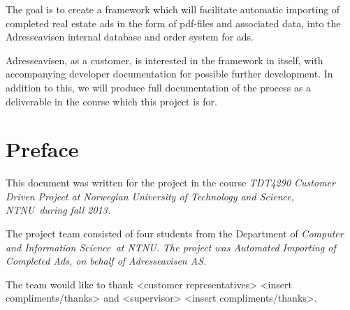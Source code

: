The goal is to create a framework which will facilitate automatic importing of completed real estate ads in the form of pdf-files and associated data, into the Adresseavisen internal database and order system for ads.

Adresseavisen, as a customer, is interested in the framework in itself, with accompanying developer documentation for possible further development. In addition to this, we will produce full documentation of the process as a deliverable in the course which this project is for.

\newpage

\section{Preface}
This document was written for the project in the course \em TDT4290 Customer Driven Project at Norwegian University of Technology and Science, NTNU\em \ during fall 2013.

The project team consisted of four students from the Department of \em Computer and Information Science\em \ at \em NTNU\em. The project was \em Automated Importing of Completed Ads\em, on behalf of \em Adresseavisen AS\em.

The team would like to thank <customer representatives> <insert compliments/thanks> and <supervisor> <insert compliments/thanks>.


%
